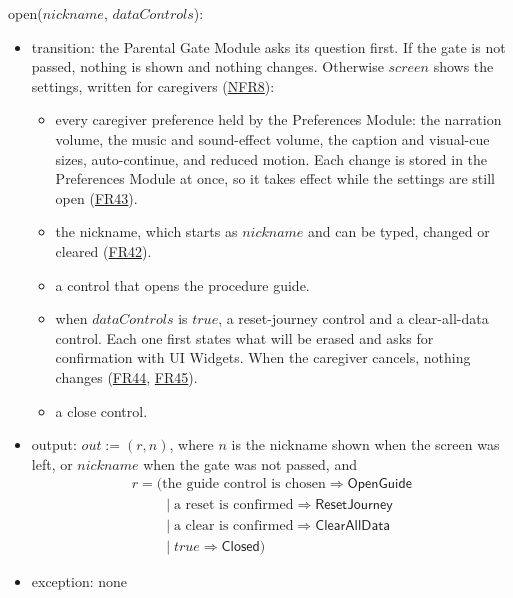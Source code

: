 \documentclass[10pt, titlepage]{article}
\newcommand{\srsurl}{https://team-hindsight.github.io/ophthamology-game/SRS/SRS.pdf}
\newcommand{\srsitemref}[2]{\href{\srsurl\#nameddest=#1}{#2}}
\newcommand{\T}[1]{\mathit{#1}}          %
\newcommand{\V}[1]{\mathsf{#1}}          %
\newcommand{\out}{\mathit{out}}
\newcommand{\true}{\mathit{true}}
\begin{document}
\begin{samepage}
\noindent open($\T{nickname}$, $\T{dataControls}$):
\begin{itemize}
\item transition: the Parental Gate Module asks its question first. If the
  gate is not passed, nothing is shown and nothing changes. Otherwise
  $\T{screen}$ shows the settings, written for caregivers
  (\srsitemref{NFR_Language}{NFR8}):
  \begin{itemize}
  \item every caregiver preference held by the Preferences Module: the
    narration volume, the music and sound-effect volume, the caption and
    visual-cue sizes, auto-continue, and reduced motion. Each
    change is stored in the Preferences Module at once, so it takes effect
    while the settings are still open (\srsitemref{FR_Preferences}{FR43}).
  \item the nickname, which starts as $\T{nickname}$ and can be typed,
    changed or cleared (\srsitemref{FR_Nickname}{FR42}).
  \item a control that opens the procedure guide.
  \item when $\T{dataControls}$ is $\true$, a reset-journey control and a
    clear-all-data control. Each one first states what will be erased and asks
    for confirmation with UI Widgets. When the caregiver cancels, nothing
    changes (\srsitemref{FR_ResetJourney}{FR44},
    \srsitemref{FR_ClearAllData}{FR45}).
  \item a close control.
  \end{itemize}
\item output: $\out := (r, n)$, where $n$ is the nickname shown when the
  screen was left, or $\T{nickname}$ when the gate was not passed, and
  \[\begin{array}{l}
  r = (\text{the guide control is chosen} \Rightarrow \V{OpenGuide}\\
  \phantom{r = (}\mid \text{a reset is confirmed} \Rightarrow
  \V{ResetJourney}\\
  \phantom{r = (}\mid \text{a clear is confirmed} \Rightarrow
  \V{ClearAllData}\\
  \phantom{r = (}\mid \true \Rightarrow \V{Closed})
  \end{array}\]
\item exception: none
\end{itemize}
\end{samepage}
\par\pagebreak[0]
\end{document}
